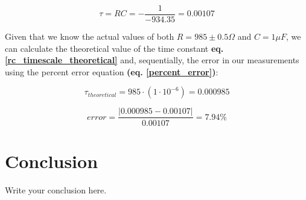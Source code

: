 \documentclass{article}
\begin{document}
\begin{equation}
    \label{rc_timescale_measured}
    \tau=RC=-\frac{1}{-934.35}=0.00107
\end{equation}

Given that we know the actual values of both $R=985\pm0.5\Omega$ and $C=1\mu F$, we
can calculate the theoretical value of the time constant \textbf{eq.
\ref{rc_timescale_theoretical}} and, sequentially, the error in our measurements
using the percent error equation \textbf{(eq. \ref{percent_error})}:

\begin{equation}
    \label{rc_timescale_theoretical}
    \tau_{theoretical}=985\cdot(1\cdot10^{-6})=0.000985
\end{equation}

\begin{equation}
    \label{rc_err_analysis}
    error=\frac{|0.000985-0.00107|}{0.00107}=7.94\%
\end{equation}

\section{Conclusion}
Write your conclusion here.
\end{document}
